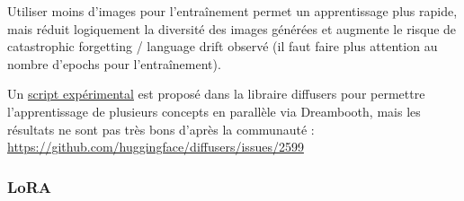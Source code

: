 \documentclass{article}
\begin{document}
Utiliser moins d'images pour l'entraînement permet un apprentissage plus rapide, mais réduit logiquement la diversité des images générées et augmente le risque de catastrophic forgetting / language drift observé (il faut faire plus attention au nombre d'epochs pour l'entraînement). \par
Un \href{https://github.com/huggingface/diffusers/tree/main/examples/research_projects/multi_subject_dreambooth}{script expérimental} est proposé dans la libraire diffusers pour permettre l'apprentissage de plusieurs concepts en parallèle via Dreambooth, mais les résultats ne sont pas très bons d'après la communauté : \url{https://github.com/huggingface/diffusers/issues/2599}


\subsubsection{LoRA}
\end{document}

